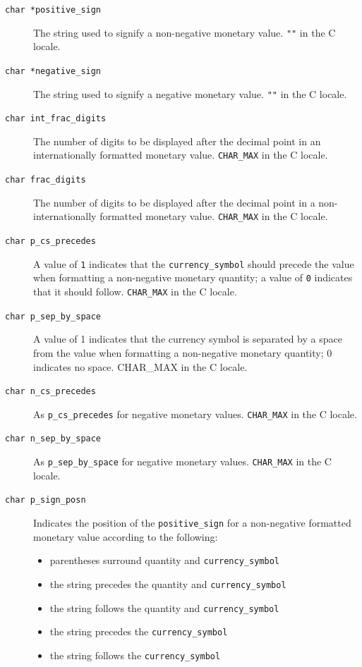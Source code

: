 \begin{description}
   \item[\texttt{char *positive\_sign}] The string used to signify a non-negative monetary value.
    \texttt{""} in the C locale.

   \item[\texttt{char *negative\_sign}] The string used to signify a negative monetary value.  \texttt{""}
    in the C locale.

   \item[\texttt{char int\_frac\_digits}] The number of digits to be displayed  after  the  decimal
    point  in  an  internationally  formatted monetary value.
    \texttt{CHAR\_MAX} in the C locale.

   \item[\texttt{char frac\_digits}] The number of digits to be displayed  after  the  decimal
    point  in a non-internationally formatted monetary value.
    \texttt{CHAR\_MAX} in the C locale.

   \item[\texttt{char p\_cs\_precedes}] A value of \texttt{1} indicates that the
    \texttt{currency\_symbol} should precede the value when formatting a
    non-negative monetary quantity; a value of \texttt{0} indicates that it
    should follow.  \texttt{CHAR\_MAX} in the C locale.

   \item[\texttt{char p\_sep\_by\_space}] A value of  1  indicates  that  the  currency  symbol  is
    separated  by  a  space  from the value when formatting a
    non-negative monetary quantity;  0  indicates  no  space.
    CHAR\_MAX in the C locale.

   \item[\texttt{char n\_cs\_precedes}] As \texttt{p\_cs\_precedes} for negative monetary  values.
    \texttt{CHAR\_MAX} in the C locale.

   \item[\texttt{char n\_sep\_by\_space}] As \texttt{p\_sep\_by\_space} for negative monetary values.
    \texttt{CHAR\_MAX} in the C locale.

   \item[\texttt{char p\_sign\_posn}] 
    Indicates the position of the \texttt{positive\_sign}  for  a
     non-negative   formatted  monetary  value  according  to  the
     following:


    \begin{itemize}
     \item parentheses surround quantity and \texttt{currency\_symbol}
     \item the string precedes the quantity and \texttt{currency\_symbol}
     \item the string follows the quantity and \texttt{currency\_symbol}
     \item the string precedes the \texttt{currency\_symbol}
     \item the string follows the \texttt{currency\_symbol}
    \end{itemize}


\end{description}
